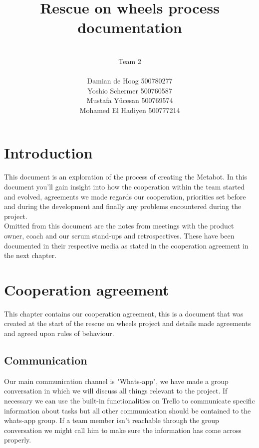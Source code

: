 \documentclass[12pt]{article}
\begin{document}
	\title{\huge Rescue on wheels process documentation}
	\author{\\Team 2\\ \\Damian de Hoog 500780277\\ Yoshio Schermer 500760587\\Mustafa Y\"{u}cesan 500769574\\ Mohamed El Hadiyen 500777214}
	\maketitle
	\newpage
	\tableofcontents
	\newpage
	\section{Introduction}
	This document is an exploration of the process of creating the Metabot. In this document you'll gain insight into how the cooperation within the team started and evolved, agreements we made regards our cooperation, priorities set before and during the development and finally any problems encountered during the project.\\
	Omitted from this document are the notes from meetings with the product owner, coach and our scrum stand-ups and retrospectives. These have been documented in their respective media as stated in the cooperation agreement in the next chapter.
	\newpage
	\section{Cooperation agreement}
	This chapter contains our cooperation agreement, this is a document that was created at the start of the rescue on wheels project and details made agreements and agreed upon rules of behaviour.
	\subsection{Communication}
	Our main communication channel is "Whats-app", we have made a group conversation in which we will discuss all things relevant to the project. If necessary we can use the built-in functionalities on Trello to communicate specific information about tasks but all other communication should be contained to the whats-app group. If a team member isn't reachable through the group conversation we might call him to make sure the information has come across properly.
\end{document}
